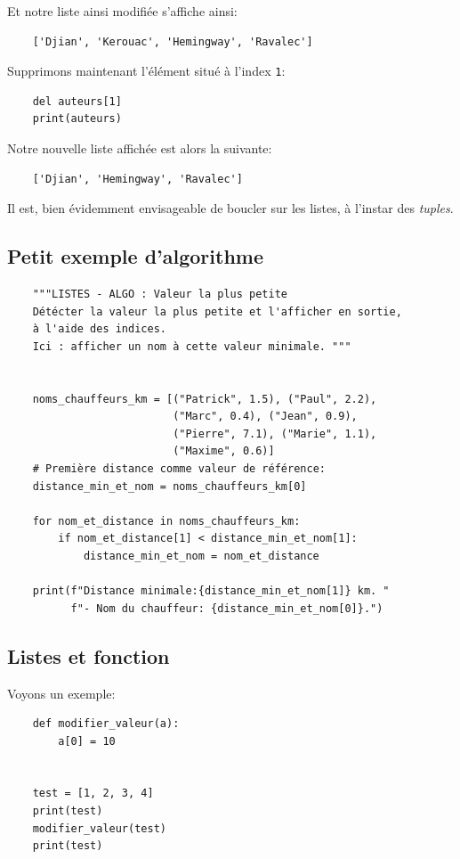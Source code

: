 \documentclass[a4paper,11pt]{book}
\begin{document}
Et notre liste ainsi modifiée s'affiche ainsi:
\begin{verbatim}
    ['Djian', 'Kerouac', 'Hemingway', 'Ravalec']  
\end{verbatim}
\medskip

Supprimons maintenant l'élément situé à l'index \texttt{1}:
\begin{verbatim}
    del auteurs[1]
    print(auteurs)
\end{verbatim}
\medskip

Notre nouvelle liste affichée est alors la suivante:
\begin{verbatim}
    ['Djian', 'Hemingway', 'Ravalec']
\end{verbatim}
\medskip

Il est, bien évidemment envisageable de boucler sur les listes, à l'instar des \textit{tuples}.
\medskip

\subsection*{Petit exemple d'algorithme}
\begin{lstlisting}
    """LISTES - ALGO : Valeur la plus petite
    Détécter la valeur la plus petite et l'afficher en sortie,
    à l'aide des indices.
    Ici : afficher un nom à cette valeur minimale. """


    noms_chauffeurs_km = [("Patrick", 1.5), ("Paul", 2.2), 
                          ("Marc", 0.4), ("Jean", 0.9), 
                          ("Pierre", 7.1), ("Marie", 1.1),
                          ("Maxime", 0.6)]
    # Première distance comme valeur de référence:
    distance_min_et_nom = noms_chauffeurs_km[0]  

    for nom_et_distance in noms_chauffeurs_km:
        if nom_et_distance[1] < distance_min_et_nom[1]:
            distance_min_et_nom = nom_et_distance

    print(f"Distance minimale:{distance_min_et_nom[1]} km. "
          f"- Nom du chauffeur: {distance_min_et_nom[0]}.")
\end{lstlisting}
\medskip

\subsection*{Listes et fonction}
Voyons un exemple:
\begin{lstlisting}
    def modifier_valeur(a):
        a[0] = 10
    
    
    test = [1, 2, 3, 4]
    print(test)
    modifier_valeur(test)
    print(test)
\end{lstlisting}
\medskip
\end{document}
